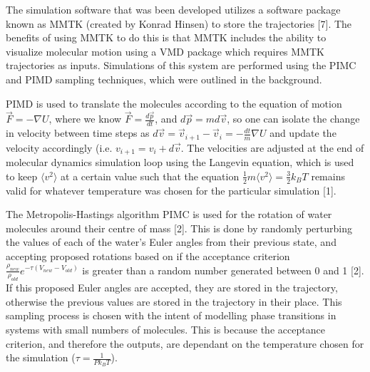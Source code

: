 \documentclass[11pt]{article}
\begin{document}
The simulation software that was been developed utilizes a software package known as MMTK (created by Konrad Hinsen) to store the trajectories [7]. The benefits of using MMTK to do this is that MMTK includes the ability to visualize molecular motion using a VMD package which requires MMTK trajectories as inputs. Simulations of this system are performed using the PIMC and PIMD sampling techniques, which were outlined in the background. 

PIMD is used to translate the molecules according to the equation of motion \begin{math} \vec{F} = -\nabla{U} \end{math}, where we know \begin{math} \vec{F} = \frac{d \vec{p}}{dt} \end{math}, and \begin{math} d \vec{p} = m d \vec{v} \end{math}, so one can isolate the change in velocity between time steps as \begin{math} d \vec{v} = \vec{v}_{i+1} - \vec{v}_i = - \frac{dt}{m} \nabla{U} \end{math} and update the velocity accordingly (i.e. \begin{math} v_{i+1} = v_i + d \vec{v} \end{math}. The velocities are adjusted at the end of molecular dynamics simulation loop using the Langevin equation, which is used to keep \begin{math} \langle v^2 \rangle \end{math} at a certain value such that the equation \begin{math} \frac{1}{2} m \langle v^2 \rangle = \frac{3}{2} k_B T \end{math} remains valid for whatever temperature was chosen for the particular simulation [1].

The Metropolis-Hastings algorithm PIMC is used for the rotation of water molecules around their centre of mass [2]. This is done by randomly perturbing the values of each of the water's Euler angles from their previous state, and accepting proposed rotations based on if the acceptance criterion \begin{math} \frac{\rho_{new}}{\rho_{old}} e^{- \tau ( V_{new} - V_{old} )} \end{math} is greater than a random number generated between 0 and 1 [2]. If this proposed Euler angles are accepted, they are stored in the trajectory, otherwise the previous values are stored in the trajectory in their place. This sampling process is chosen with the intent of modelling phase transitions in systems with small numbers of molecules. This is because the acceptance criterion, and therefore the outputs, are dependant on the temperature chosen for the simulation (\begin{math} \tau = \frac{1}{P k_B T} \end{math}). 
\end{document}
